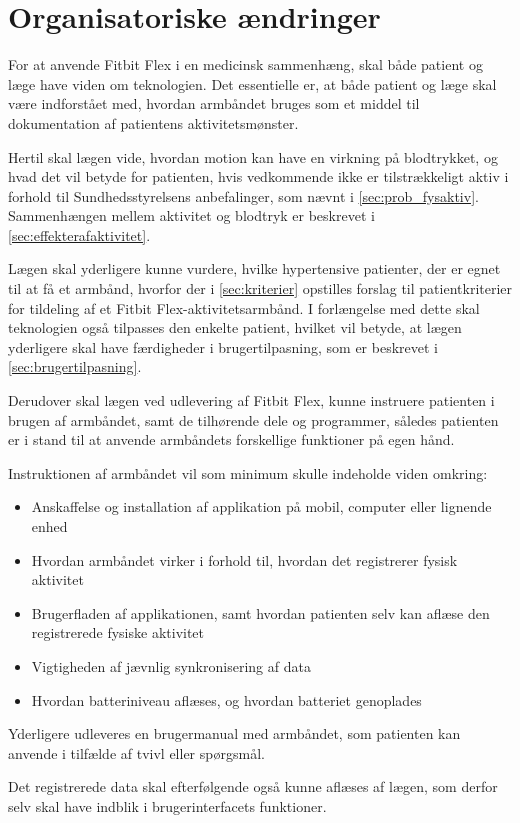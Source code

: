\section{Organisatoriske ændringer}\label{sec:org_aendringer}

For at anvende Fitbit Flex i en medicinsk sammenhæng, skal både patient og læge have viden om teknologien. Det essentielle er, at både patient og læge skal være indforstået med, hvordan armbåndet bruges som et middel til dokumentation af patientens aktivitetsmønster.

Hertil skal lægen vide, hvordan motion kan have en virkning på blodtrykket, og hvad det vil betyde for patienten, hvis vedkommende ikke er tilstrækkeligt aktiv i forhold til Sundhedsstyrelsens anbefalinger, som nævnt i \autoref{sec:prob_fysaktiv}. Sammenhængen mellem aktivitet og blodtryk er beskrevet i \autoref{sec:effekterafaktivitet}.

Lægen skal yderligere kunne vurdere, hvilke hypertensive patienter, der er egnet til at få et armbånd, hvorfor der i \autoref{sec:kriterier} opstilles forslag til patientkriterier for tildeling af et Fitbit Flex-aktivitetsarmbånd. I forlængelse med dette skal teknologien også tilpasses den enkelte patient, hvilket vil betyde, at lægen yderligere skal have færdigheder i brugertilpasning, som er beskrevet i \autoref{sec:brugertilpasning}. 

Derudover skal lægen ved udlevering af Fitbit Flex, kunne instruere patienten i brugen af armbåndet, samt de tilhørende dele og programmer, således patienten er i stand til at anvende armbåndets forskellige funktioner på egen hånd. 

Instruktionen af armbåndet vil som minimum skulle indeholde viden omkring: 
\begin{itemize}
\item Anskaffelse og installation af applikation på mobil, computer eller lignende enhed
\item Hvordan armbåndet virker i forhold til, hvordan det registrerer fysisk aktivitet 
\item Brugerfladen af applikationen, samt hvordan patienten selv kan aflæse den registrerede fysiske aktivitet
\item Vigtigheden af jævnlig synkronisering af data 
\item Hvordan batteriniveau aflæses, og hvordan batteriet genoplades 
\end{itemize} 

Yderligere udleveres en brugermanual med armbåndet, som patienten kan anvende i tilfælde af tvivl eller spørgsmål.   

Det registrerede data skal efterfølgende også kunne aflæses af lægen, som derfor selv skal have indblik i brugerinterfacets funktioner.

